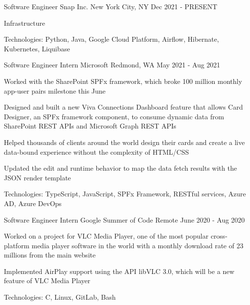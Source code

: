
\begin{cventries}
  \cventry
    {Software Engineer} %
    {Snap Inc.} %
    {New York City, NY} %
    {Dec 2021 - PRESENT} %
    {
      \begin{cvitems} %
        \item {Infrastructure}
        \item {Technologies: Python, Java, Google Cloud Platform, Airflow, Hibernate, Kubernetes, Liquibase}
      \end{cvitems}
    }

  \cventry
    {Software Engineer Intern} %
    {Microsoft} %
    {Redmond, WA} %
    {May 2021 - Aug 2021} %
    {
      \begin{cvitems} %
        \item {Worked with the SharePoint SPFx framework, which broke 100 million monthly app-user pairs milestone this June}
        \item {Designed and built a new Viva Connections Dashboard feature that allows Card Designer, an SPFx framework component, to consume dynamic data from SharePoint REST APIs and Microsoft Graph REST APIs}
        \item {Helped thousands of clients around the world design their cards and create a live data-bound experience without the complexity of HTML/CSS}
        \item {Updated the edit and runtime behavior to map the data fetch results with the JSON render template}
        \item {Technologies: TypeScript, JavaScript, SPFx Framework, RESTful services, Azure AD, Azure DevOps}
      \end{cvitems}
    }

  \cventry
    {Software Engineer Intern} %
    {Google Summer of Code} %
    {Remote} %
    {June 2020 - Aug 2020} %
    {
      \begin{cvitems} %
        \item {Worked on a project for VLC Media Player, one of the most popular cross-platform media player software in the world with a monthly download rate of 23 millions from the main website}
        \item {Implemented AirPlay support using the API libVLC 3.0, which will be a new feature of VLC Media Player}
        \item {Technologies: C, Linux, GitLab, Bash}
      \end{cvitems}
    }


\end{cventries}
